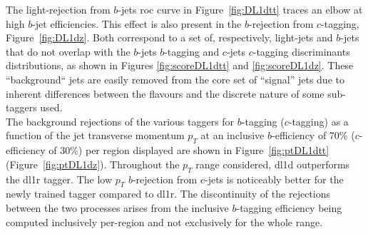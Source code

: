 The light-rejection from $b$-jets \gls{roc} curve in Figure~\ref{fig:DL1dtt} traces an elbow at high $b$-jet efficiencies. This effect is also present in the $b$-rejection from $c$-tagging, Figure~\ref{fig:DL1dz}. Both correspond to a set of, respectively, light-jets and $b$-jets that do not overlap with the $b$-jets $b$-tagging and $c$-jets $c$-tagging discriminants distributions, as shown in Figures \ref{fig:scoreDL1dtt} and \ref{fig:scoreDL1dz}. These ``background`` jets are easily removed from the core set of ``signal'' jets due to inherent differences between the flavours and the discrete nature of some sub-taggers used. \\

The background rejections of the various taggers for $b$-tagging ($c$-tagging) as a function of the jet transverse momentum $p_T$ at an inclusive $b$-efficiency of 70\% ($c$-efficiency of 30\%) per region displayed are shown in Figure~\ref{fig:ptDL1dtt} (Figure~\ref{fig:ptDL1dz}). Throughout the $p_T$ range considered, \gls{dl1d} outperforms the \gls{dl1r} tagger. The low $p_T$ $b$-rejection from $c$-jets is noticeably better for the newly trained tagger compared to \gls{dl1r}. The discontinuity of the rejections between the two processes arises from the inclusive $b$-tagging efficiency being computed inclusively per-region and not exclusively for the whole range. 

